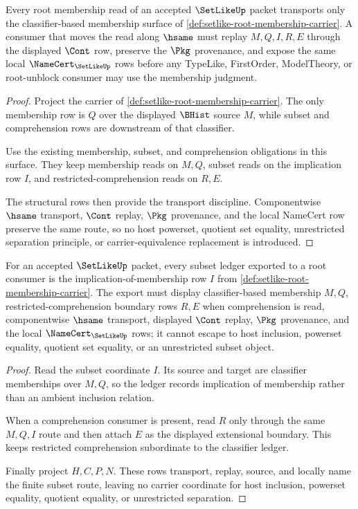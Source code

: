 \begin{theorem}
\label{thm:setlike-root-membership-transport}
Every root membership read of an accepted $\SetLikeUp$ packet transports only the classifier-based membership surface of \autoref{def:setlike-root-membership-carrier}. A consumer that moves the read along $\hsame$ must replay $M,Q,I,R,E$ through the displayed $\Cont$ row, preserve the $\Pkg$ provenance, and expose the same local $\NameCert_{\SetLikeUp}$ rows before any TypeLike, FirstOrder, ModelTheory, or root-unblock consumer may use the membership judgment.
\end{theorem}
\begin{proof}
Project the carrier of \autoref{def:setlike-root-membership-carrier}. The only membership row is $Q$ over the displayed $\BHist$ source $M$, while subset and comprehension rows are downstream of that classifier.

Use the existing membership, subset, and comprehension obligations in this surface. They keep membership reads on $M,Q$, subset reads on the implication row $I$, and restricted-comprehension reads on $R,E$.

The structural rows then provide the transport discipline. Componentwise $\hsame$ transport, $\Cont$ replay, $\Pkg$ provenance, and the local NameCert row preserve the same route, so no host powerset, quotient set equality, unrestricted separation principle, or carrier-equivalence replacement is introduced.
\end{proof}

\begin{theorem}
\label{thm:setlike-root-subset-ledger-nonescape}
For an accepted $\SetLikeUp$ packet, every subset ledger exported to a root consumer is the implication-of-membership row $I$ from \autoref{def:setlike-root-membership-carrier}. The export must display classifier-based membership $M,Q$, restricted-comprehension boundary rows $R,E$ when comprehension is read, componentwise $\hsame$ transport, displayed $\Cont$ replay, $\Pkg$ provenance, and the local $\NameCert_{\SetLikeUp}$ rows; it cannot escape to host inclusion, powerset equality, quotient set equality, or an unrestricted subset object.
\end{theorem}
\begin{proof}
Read the subset coordinate $I$. Its source and target are classifier memberships over $M,Q$, so the ledger records implication of membership rather than an ambient inclusion relation.

When a comprehension consumer is present, read $R$ only through the same $M,Q,I$ route and then attach $E$ as the displayed extensional boundary. This keeps restricted comprehension subordinate to the classifier ledger.

Finally project $H,C,P,N$. These rows transport, replay, source, and locally name the finite subset route, leaving no carrier coordinate for host inclusion, powerset equality, quotient equality, or unrestricted separation.
\end{proof}

